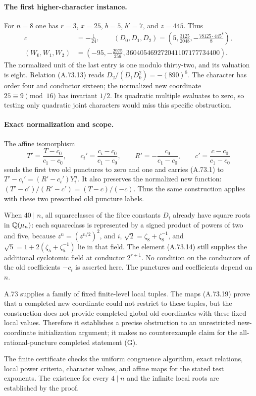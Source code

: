 \paragraph{The first higher-character instance.}
For $n=8$ one has $r=3$, $x=25$, $b=5$, $b'=7$, and $z=445$.
Thus
\[
 \begin{split}
 c&=-\frac1{24},\qquad
 (D_0,D_1,D_2)=
      \left(5,\frac{3125}{2048},-\frac{78125\cdot445^8}{8}\right),\\
 (W_0,W_1,W_2)&=
      \left(-95,-\frac{2975}{256},
                         360405469272041107177734400\right).
 \end{split}
       \tag{A.73.20}
\]
The normalized unit of the last entry is one modulo thirty-two,
and its valuation is eight.  Relation (A.73.13) reads
$D_2/(D_1D_0^2)=-(890)^8$.
The character has order four and conductor sixteen;
the normalized new coordinate $25\equiv9\pmod{16}$ has
invariant $1/2$.  Its quadratic multiple evaluates to zero,
so testing only quadratic joint characters would miss this
specific obstruction.

\paragraph{Exact normalization and scope.}
The affine isomorphism
\[
    T'=\frac{T-c_0}{c_1-c_0},\qquad
    c_i'=\frac{c_i-c_0}{c_1-c_0},\qquad
    R'=-\frac{c_0}{c_1-c_0},\qquad
    c'=\frac{c-c_0}{c_1-c_0}
       \tag{A.73.21}
\]
sends the first two old punctures to zero and one and carries
(A.73.1) to $T'-c_i'=(R'-c_i')Y_i^n$.
It also preserves the normalized new function:
$(T'-c')/(R'-c')=(T-c)/(-c)$.
Thus the same construction applies with these two prescribed
old puncture labels.

When $40\mid n$, all squareclasses of the fibre constants
$D_i$ already have square roots in $\mathbb Q(\mu_n)$: each squareclass
is represented by a signed product of powers of two and five,
because $z^n=(z^{n/2})^2$, and
$i$, $\sqrt2=\zeta_8+\zeta_8^{-1}$, and
$\sqrt5=1+2(\zeta_5+\zeta_5^{-1})$ lie in that field.
The element (A.73.14) still supplies the additional cyclotomic
field at conductor $2^{r+1}$.
No condition on the conductors of the old coefficients $-c_i$
is asserted here.  The punctures and coefficients depend on $n$.

A.73 supplies a family of fixed finite-level local tuples.
The maps (A.73.19) prove that a completed new coordinate could
not restrict to these tuples, but the construction does not
provide completed global old coordinates with these fixed
local values.  Therefore it establishes a precise obstruction
to an unrestricted new-coordinate initialization argument;
it makes no counterexample claim for the all-rational-puncture
completed statement (G).

The finite certificate
checks the uniform congruence algorithm, exact relations,
local power criteria, character values, and affine maps for
the stated test exponents.  The existence for every $4\mid n$
and the infinite local roots are established by the proof.
